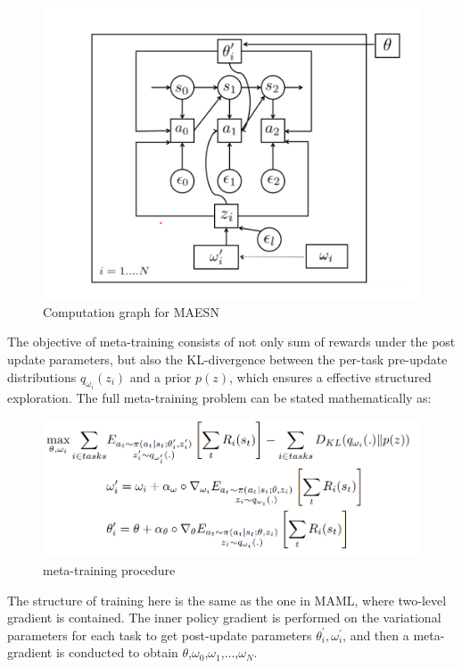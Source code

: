 \begin{figure}[H]
	\includegraphics[scale=0.7]{MAESN_02.PNG}
	\centering
	\caption{Computation graph for MAESN}
	\label{MAESN}
\end{figure}

The objective of meta-training consists of not only sum of rewards under the post update parameters, but also the KL-divergence between the per-task pre-update distributions $q_{\omega_{i}}\left(z_{i}\right)$ and a prior $p(z)$, which ensures a effective structured exploration.
The full meta-training problem can be stated mathematically as:

\begin{figure}[H]
	\includegraphics[scale=0.48]{MAESN_03.PNG}
	\centering
	\caption{meta-training procedure}
	\label{MAESN}
\end{figure}

The structure of training here is the same as the one in MAML, where two-level gradient is contained. The inner policy gradient is performed on the variational parameters for each task to get post-update parameters $\theta_{i}^{\prime}, \omega_{i}^{\prime}$, and then a meta-gradient is conducted to obtain $\theta$,$\omega_{0}$,$\omega_{1}$,...,$\omega_{N}$.


